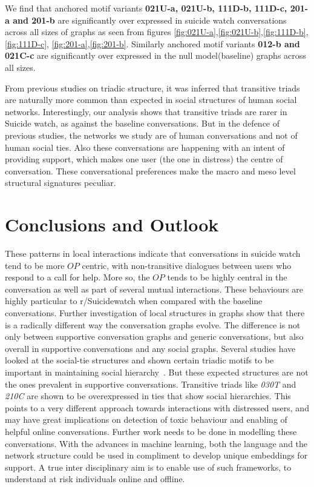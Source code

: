 We find that anchored motif variants \textbf{021U-a, 021U-b, 111D-b, 111D-c, 201-a and 201-b} are significantly over expressed in suicide watch conversations across all sizes of graphs as seen from figures \ref{fig:021U-a},\ref{fig:021U-b},\ref{fig:111D-b},\ref{fig:111D-c}, \ref{fig:201-a},\ref{fig:201-b}. Similarly anchored motif variants \textbf{012-b and 021C-c} are significantly over expressed in the null model(baseline) graphs across all sizes.

From previous studies on triadic structure, it was inferred that transitive triads are naturally more common than expected in social structures of human social networks. Interestingly, our analysis shows that transitive triads are rarer in Suicide watch, as against the baseline conversations. But in the defence of previous studies, the networks we study are of human conversations and not of human social ties. Also these conversations are happening with an intent of providing support, which makes one user (the one in distress) the centre of conversation. These conversational preferences make the macro and meso level structural signatures peculiar.

\section{Conclusions and Outlook}

These patterns in local interactions indicate that conversations in suicide watch tend to be more $OP$ centric, with non-transitive dialogues between users who respond to a call for help. More so, the $OP$ tends to be highly central in the conversation as well as part of several mutual interactions. These behaviours are highly particular to r/Suicidewatch when compared with the baseline conversations. Further investigation of local structures in graphs show that there is a radically different way the conversation graphs evolve. The difference is not only between supportive conversation graphs and generic conversations, but also overall in supportive conversations and any social graphs. 
Several studies have looked at the social-tie structures and shown certain triadic motifs to be important in maintaining social hierarchy~\cite{shizuka2015network,shizuka2012social,holland1976local,doi:10.1177/104649647100200201}. But these expected structures are not the ones prevalent in supportive conversations. Transitive triads like \textsl{030T} and \textsl{210C} are shown to be overexpressed in ties that show social hierarchies. This points to a very different approach towards interactions with distressed users, and may have great implications on detection of toxic behaviour and enabling of helpful online conversations. Further work needs to be done in modelling these conversations. With the advances in machine learning, both the language and the network structure could be used in compliment to develop unique embeddings for support. A true inter disciplinary aim is to enable use of such frameworks, to understand at risk individuals online and offline.

